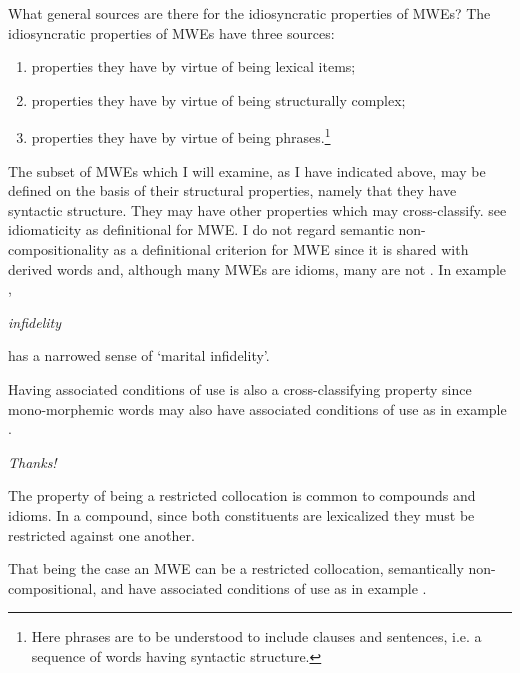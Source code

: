 \documentclass[output=paper]{langsci/langscibook}
\begin{document}
\newpage 
What general sources are there for the idiosyncratic properties of MWEs? The idiosyncratic properties of MWEs have three sources:

\begin{enumerate}
\item properties they have by virtue of being lexical items;
\item properties they have by virtue of being structurally complex;
\item properties they have by virtue of being phrases.\footnote{Here phrases are to be understood to include clauses and sentences, i.e. a sequence of words having syntactic structure.}
\end{enumerate}

The subset of MWEs which %
I will examine, as %
I have indicated above, may be defined on the basis of their structural properties, namely that 
they have syntactic structure. They may have other properties which may cross-classify. 
\citet{Sag:2002} see idiomaticity  
as definitional for MWE. %
I do not regard semantic non-compositionality 
as a definitional criterion for MWE since it is shared with derived words 
\citep{Jackendoff2002} and, although many MWEs are idioms, many are not \citep{Melcuk2012}.  In 
example ,

\begin{exe}
\ex\label{ex:ex02}	\textit{infidelity}
\end{exe}

\noindent
has a narrowed sense of ‘marital infidelity’. 

Having associated conditions of use is also a cross-classifying property since mono-morphemic words may also have associated conditions of use as in example .

\begin{exe}
\ex\label{ex:ex03}	\textit{Thanks!}
\end{exe}

The property of being a restricted collocation  
is common to compounds and idioms. In a compound, since both constituents are lexicalized they must be restricted against one another. 

That being the case an MWE can be a restricted collocation, semantically non-compositional, and have associated conditions of use as in example .
\end{document}
